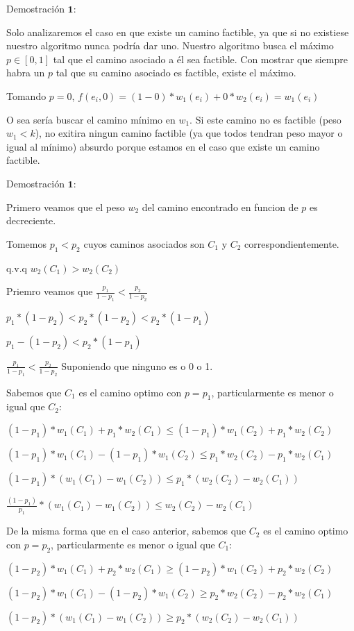 Demostraci\'on $\mathbf{1}:$

Solo analizaremos el caso en que existe un camino factible, ya que si no existiese nuestro algoritmo nunca podr\'ia dar uno.
Nuestro algoritmo busca el m\'aximo $p \in [0,1]$ tal que el camino asociado a \'el sea factible. Con mostrar que siempre habra un $p$ tal que su camino asociado es factible, existe el m\'aximo.

Tomando $p=0$, $f(e_i,0) = (1-0)*w_1(e_i) + 0*w_2(e_i) = w_1(e_i)$

O sea ser\'ia buscar el camino m\'inimo en $w_1$. Si este camino no es factible (peso $w_1 < k$), no exitira ningun camino factible (ya que todos tendran peso mayor o igual al m\'inimo) absurdo porque estamos en el caso que existe un camino factible.

Demostraci\'on $\mathbf{1}:$

Primero veamos que el peso $w_2$ del camino encontrado en funcion de $p$ es decreciente.

Tomemos $p_1 < p_2$ cuyos caminos asociados son $C_1$ y $C_2$ correspondientemente.

q.v.q $w_2(C_1) > w_2(C_2)$

Priemro veamos que $\frac{p_1}{1-p_1} < \frac{p_2}{1-p_2}$

$ p_1* (1-p_2) < p_2 * (1-p_2) < p_2 * (1-p_1)$

$ p_1 - (1-p_2) < p_2 * (1-p_1)$

$ \frac{p_1}{1-p_1} < \frac{p_2}{1-p_2} $ Suponiendo que ninguno es o 0 o 1.


Sabemos que $C_1$ es el camino optimo con $p=p_1$, particularmente es menor o igual que $C_2$:

$(1-p_1)*w_1(C_1) + p_1*w_2(C_1) \leq (1-p_1)*w_1(C_2) + p_1*w_2(C_2) $

$(1-p_1)*w_1(C_1) - (1-p_1)*w_1(C_2) \leq  p_1*w_2(C_2) - p_1*w_2(C_1) $

$(1-p_1)*(w_1(C_1) - w_1(C_2)) \leq  p_1*(w_2(C_2) - w_2(C_1)) $

$\frac{(1-p_1)}{p_1}*(w_1(C_1) - w_1(C_2)) \leq  w_2(C_2) - w_2(C_1) $

De la misma forma que en el caso anterior, sabemos que $C_2$ es el camino optimo con $p=p_2$, particularmente es menor o igual que $C_1$:

$(1-p_2)*w_1(C_1) + p_2*w_2(C_1) \geq (1-p_2)*w_1(C_2) + p_2*w_2(C_2) $

$(1-p_2)*w_1(C_1) - (1-p_2)*w_1(C_2) \geq  p_2*w_2(C_2) - p_2*w_2(C_1) $

$(1-p_2)*(w_1(C_1) - w_1(C_2)) \geq  p_2*(w_2(C_2) - w_2(C_1)) $

